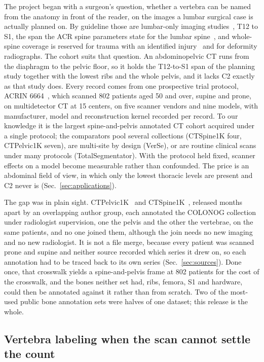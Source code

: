 \documentclass[aapm,mph,amsmath,amssymb,reprint]{revtex4-2}
\begin{document}
The project began with a surgeon's question, whether a vertebra can be named from the anatomy in front of the reader, on the images a lumbar surgical case is actually planned on. By guideline those are lumbar-only imaging studies~\cite{acr2021,nass2013,acrct2022}, T12 to S1, the span the ACR spine parameters state for the lumbar spine~\cite{acrmri2023}, and whole-spine
coverage is reserved for trauma with an identified injury~\cite{tqip2018} and for deformity
radiographs. The cohort suits that question. An abdominopelvic CT runs from the diaphragm to the pelvic
floor, so it holds the T12-to-S1 span of the planning study together with the lowest ribs
and the whole pelvis, and it lacks C2 exactly as that study does. Every record
comes from one prospective trial protocol, ACRIN 6664~\cite{colonog,tcia}, which scanned 802 patients aged 50 and over, supine and prone, on multidetector CT at 15 centers, on five scanner
vendors and nine models, with manufacturer, model and reconstruction kernel recorded per
record. To our knowledge it is the largest spine-and-pelvis annotated CT cohort acquired
under a single protocol; the comparators pool several collections (CTSpine1K four,
CTPelvic1K seven), are multi-site by design (VerSe), or are routine clinical scans under
many protocols (TotalSegmentator). With the protocol held fixed, scanner effects on a
model become measurable rather than confounded. The price is an abdominal field of view, in which only the lowest thoracic levels are present and C2 never is (Sec.~\ref{sec:applications}).

The gap was in plain sight. CTPelvic1K~\cite{ctpelvic1k} and CTSpine1K~\cite{ctspine1k},
released months apart by an overlapping author group, each annotated the COLONOG
collection under radiologist supervision, one the pelvis and the other the vertebrae, on the
same patients, and no one joined them, although the join needs no new imaging and no new
radiologist. It is not a file merge, because every patient was scanned prone and supine and neither
source recorded which series it drew on, so each annotation had to be traced back to its
own series (Sec.~\ref{sec:sources}). Done once, that crosswalk yields a spine-and-pelvis
frame at 802 patients for the cost of the crosswalk, and the bones neither set had, ribs, femora,
S1 and hardware, could then be annotated against it rather than from scratch. Two of the
most-used public bone annotation sets were halves of one dataset; this release is the whole.



\subsection{Vertebra labeling when the scan cannot settle the count}
\end{document}
